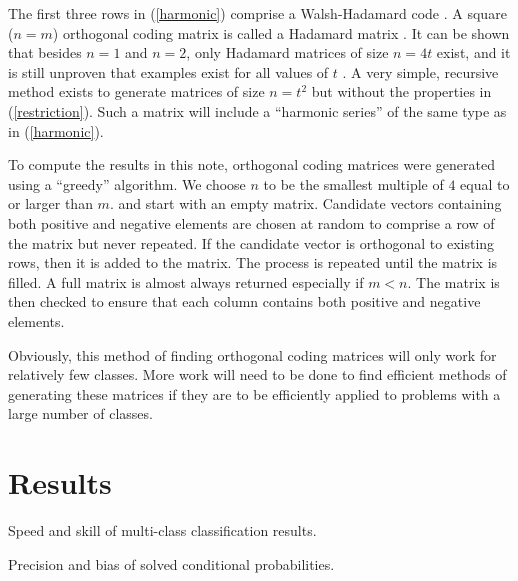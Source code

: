 The first three rows in (\ref{harmonic}) comprise a Walsh-Hadamard code \citep{Arora_Barak2009}.
A square ($n=m$) orthogonal coding matrix is called a Hadamard matrix
\citep{Sylvester1867}.
It can be shown that besides $n=1$ and $n=2$, only Hadamard matrices of size
$n=4t$ exist,  
and it is still unproven that examples exist for all values of $t$
\citep{Hedayat_Wallis1978}.
A very simple, recursive method exists to generate matrices of size $n=t^2$ 
\citep{Hedayat_Wallis1978} but without the properties in (\ref{restriction}).
Such a matrix will include a ``harmonic series'' of the same type as in
(\ref{harmonic}).


To compute the results in this note, orthogonal coding matrices were generated
using a ``greedy'' algorithm.
We choose $n$ to be the smallest multiple of $4$ equal to or larger than $m$.
and start with an empty matrix.
Candidate vectors containing both positive and negative elements 
are chosen at random to comprise a row of the matrix but never repeated.
If the candidate vector is orthogonal to existing rows, then it is added to the matrix.
The process is repeated until the matrix is filled.
A full matrix is almost always returned especially if $m<n$.
The matrix is then checked to ensure that 
each column contains both positive and negative elements.

Obviously, this method of finding orthogonal coding matrices
will only work for relatively few classes.
More work will need to be done to find efficient methods
of generating these matrices
if they are to be efficiently applied to problems with a large number of classes.


\section{Results}

\begin{table}
\caption{Speed and skill of multi-class classification results.}\label{class_results}

\caption{Precision and bias of solved conditional probabilities.}\label{prob_results}

\end{table}

